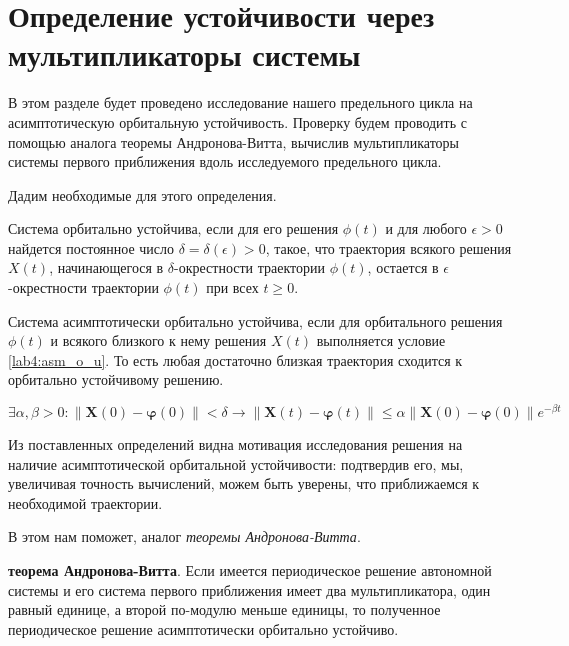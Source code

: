 \chapter{Определение устойчивости через мультипликаторы системы}\label{lab4}

В этом разделе будет проведено исследование нашего предельного цикла
на асимптотическую орбитальную устойчивость. Проверку будем проводить с помощью
аналога теоремы Андронова-Витта, вычислив мультипликаторы системы первого
приближения вдоль исследуемого предельного цикла.

Дадим необходимые для этого определения.

\begin{definition}
    Система орбитально устойчива, если для его решения $\phi(t)$ и  для любого
    $\epsilon > 0$ найдется постоянное число $\delta=\delta(\epsilon) > 0$, такое,
    что траектория всякого решения $X(t)$, начинающегося в $\delta$-окрестности
    траектории $\phi(t)$, остается в $\epsilon$-окрестности траектории $\phi(t)$
    при всех $t \geq 0$.
\end{definition}

\begin{definition}
    Система асимптотически орбитально устойчива, если для орбитального решения
    $\phi(t)$ и всякого близкого к нему решения $X(t)$ выполняется условие
    \eqref{lab4:asm_o_u}. То есть любая достаточно близкая
    траектория сходится к орбитально устойчивому решению.
\end{definition}

\begin{equation}\label{lab4:asm_o_u}
    \exists \alpha, \beta > 0:
    \left\| {\mathbf{X}\left( 0 \right) -
            \boldsymbol{\varphi} \left( 0 \right)}
    \right\| < \delta
    \rightarrow
    \left\| {\mathbf{X}\left( t \right) -
            \boldsymbol{\varphi} \left( t \right)}
    \right\| \le \alpha
    \left\| {\mathbf{X}\left( 0 \right) -
            \boldsymbol{\varphi} \left( 0 \right)}
    \right\|{e^{ - \beta t}}
\end{equation}

Из поставленных определений видна мотивация исследования решения на наличие
асимптотической орбитальной устойчивости: подтвердив его, мы, увеличивая
точность вычислений, можем быть уверены, что приближаемся к необходимой
траектории.

В этом нам поможет, аналог \textit{теоремы Андронова-Витта}.

\begin{theorem}
    \textbf{теорема Андронова-Витта}. Если имеется
    периодическое решение автономной системы и его система первого приближения
    имеет два мультипликатора, один равный единице, а второй по-модулю меньше
    единицы, то полученное периодическое решение асимптотически орбитально устойчиво.
\end{theorem}

